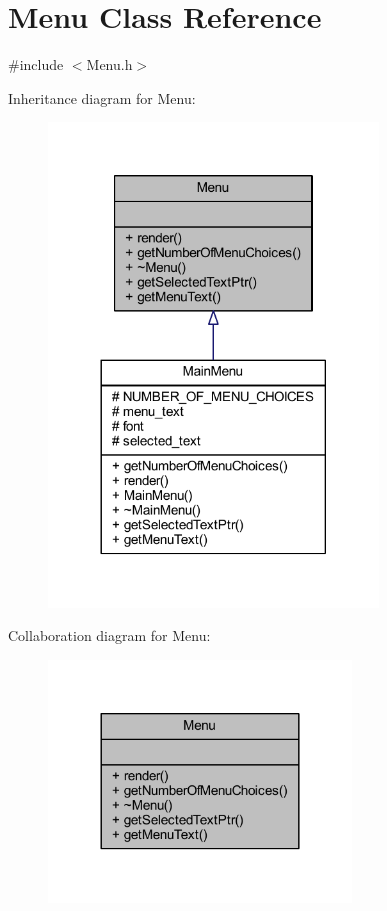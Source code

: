 \hypertarget{class_menu}{}\section{Menu Class Reference}
\label{class_menu}


{\ttfamily \#include $<$Menu.\+h$>$}



Inheritance diagram for Menu\+:\nopagebreak
\begin{figure}[H]
\begin{center}
\leavevmode
\includegraphics[width=248pt]{class_menu__inherit__graph}
\end{center}
\end{figure}


Collaboration diagram for Menu\+:\nopagebreak
\begin{figure}[H]
\begin{center}
\leavevmode
\includegraphics[width=228pt]{class_menu__coll__graph}
\end{center}
\end{figure}
